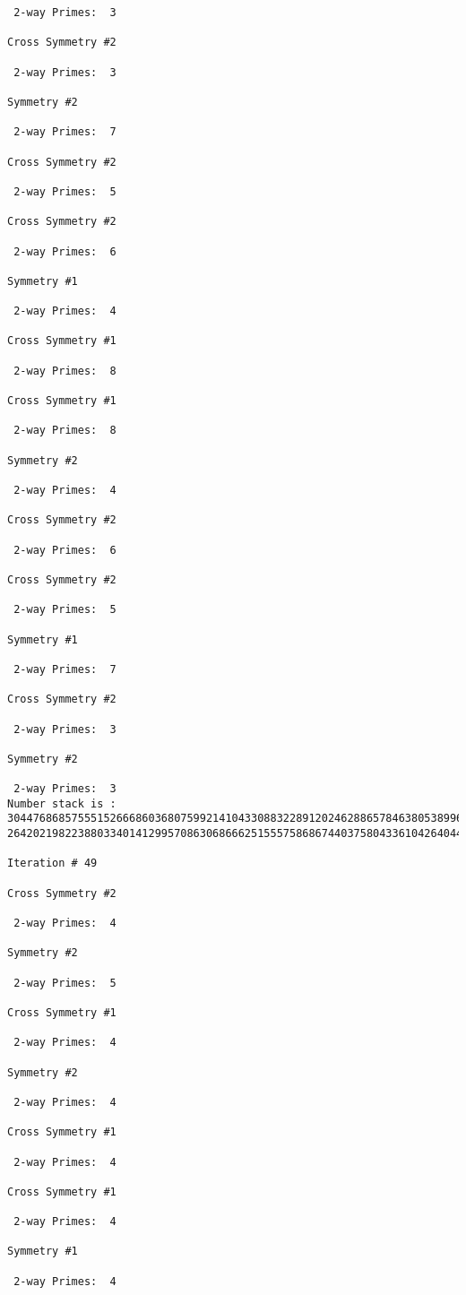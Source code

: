 {{{{\begin{verbatim}
 2-way Primes: 	3

Cross Symmetry #2

 2-way Primes: 	3

Symmetry #2

 2-way Primes: 	7

Cross Symmetry #2

 2-way Primes: 	5

Cross Symmetry #2

 2-way Primes: 	6

Symmetry #1

 2-way Primes: 	4

Cross Symmetry #1

 2-way Primes: 	8

Cross Symmetry #1

 2-way Primes: 	8

Symmetry #2

 2-way Primes: 	4

Cross Symmetry #2

 2-way Primes: 	6

Cross Symmetry #2

 2-way Primes: 	5

Symmetry #1

 2-way Primes: 	7

Cross Symmetry #2

 2-way Primes: 	3

Symmetry #2

 2-way Primes: 	3
Number stack is :
30447686857555152666860368075992141043308832289120246288657846380538996794608835958544046240163340857
26420219822388033401412995708630686662515557586867440375804336104264044585953880649769983508364875688

Iteration #	49

Cross Symmetry #2

 2-way Primes: 	4

Symmetry #2

 2-way Primes: 	5

Cross Symmetry #1

 2-way Primes: 	4

Symmetry #2

 2-way Primes: 	4

Cross Symmetry #1

 2-way Primes: 	4

Cross Symmetry #1

 2-way Primes: 	4

Symmetry #1

 2-way Primes: 	4


\end{verbatim}}}}}
